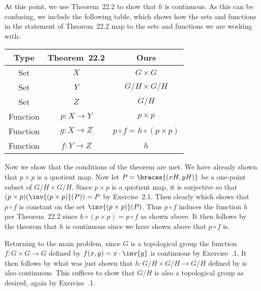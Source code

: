 {{    At this point, we use Theorem~22.2 to show that $h$ is continuous.
    As this can be confusing, we include the following table, which shows how the sets and functions in the statement of Theorem~22.2 map to the sets and functions we are working with:
    \begin{center}
      \begin{tabular}{c|c|c}
        Type & Theorem~22.2 & Ours \\
        \hline
        Set & $X$ & $G \times G$ \\
        Set & $Y$ & $G/H \times G/H$ \\
        Set & $Z$ & $G/H$ \\
        Function & $p: X \to Y$ & $p \times p$ \\
        Function & $g: X \to Z$ & $p \circ f = h \circ (p \times p)$ \\
        Function & $f: Y \to Z$ & $h$
      \end{tabular}
    \end{center}
    Now we show that the conditions of the theorem are met.
    We have already shown that $p \times p$ is a quotient map.
    Now let $P = \braces{(xH, yH)}$ be a one-point subset of $G/H \times G/H$.
    Since $p \times p$ is a quotient map, it is surjective so that $(p \times p)(\inv{(p \times p)}(P)) = P$ by Exercise~2.1.
    Then clearly
    which shows that $p \circ f$ is constant on the set $\inv{(p \times p)}(P)$.
    Thus $p \circ f$ induces the function $h$ per Theorem~22.2 since $h \circ (p \times p) = p \circ f$ as shown above.
    It then follows by the theorem that $h$ is continuous since we have shown above that $p \circ f$ is.

    Returning to the main problem, since $G$ is a topological group the function $f: G \times G \to G$ defined by $f(x,y) = x \cdot \inv{y}$ is continuous by Exercise~\secl.1.
    It then follows by what was just shown that $h : G/H \times G/H \to G/H$ defined by
    is also continuous.
    This suffices to show that $G/H$ is also a topological group as desired, again by Exercise~\secl.1.
  }
}


